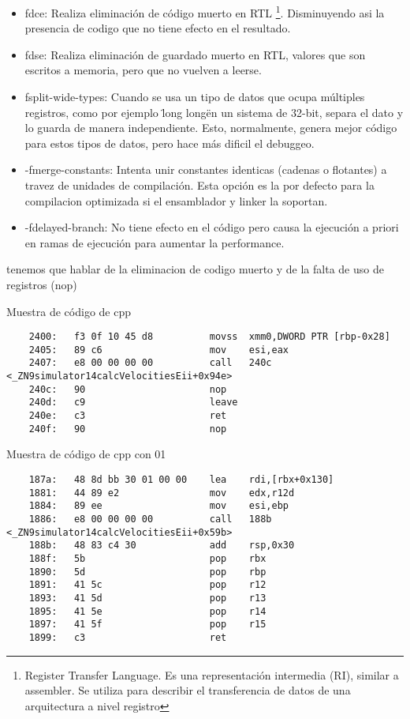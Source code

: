 \begin{itemize}
	\item fdce: Realiza eliminación de código muerto en RTL \footnote{Register Transfer Language. Es una representación intermedia (RI), similar a assembler. Se utiliza para describir el transferencia de datos de una arquitectura a nivel registro}. Disminuyendo asi la presencia de codigo que no tiene efecto en el resultado.
	\item fdse: Realiza eliminación de guardado muerto en RTL, valores que son escritos a memoria, pero que no vuelven a leerse.
	\item fsplit-wide-types: Cuando se usa un tipo de datos que ocupa múltiples registros, como por ejemplo \"long long\" en un sistema de 32-bit, separa el dato y lo guarda de manera independiente. Esto, normalmente, genera mejor código para estos tipos de datos, pero hace más dificil el debuggeo.
	\item -fmerge-constants: Intenta unir constantes identicas (cadenas o flotantes) a travez de unidades de compilación. Esta opción es la por defecto para la compilacion optimizada si el ensamblador y linker la soportan.
	\item -fdelayed-branch: No tiene efecto en el código pero causa la ejecución a priori en ramas de ejecución para aumentar la performance.
\end{itemize}


\colorbox{BurntOrange}{tenemos que hablar de la eliminacion de codigo muerto y de la falta de uso de registros (nop)}

Muestra de código de cpp 
\begin{verbatim}
    2400:	f3 0f 10 45 d8       	movss  xmm0,DWORD PTR [rbp-0x28]
    2405:	89 c6                	mov    esi,eax
    2407:	e8 00 00 00 00       	call   240c <_ZN9simulator14calcVelocitiesEii+0x94e>
    240c:	90                   	nop
    240d:	c9                   	leave  
    240e:	c3                   	ret    
    240f:	90                   	nop
\end{verbatim}

Muestra de código de cpp con 01
\begin{verbatim}
    187a:	48 8d bb 30 01 00 00 	lea    rdi,[rbx+0x130]
    1881:	44 89 e2             	mov    edx,r12d
    1884:	89 ee                	mov    esi,ebp
    1886:	e8 00 00 00 00       	call   188b <_ZN9simulator14calcVelocitiesEii+0x59b>
    188b:	48 83 c4 30          	add    rsp,0x30
    188f:	5b                   	pop    rbx
    1890:	5d                   	pop    rbp
    1891:	41 5c                	pop    r12
    1893:	41 5d                	pop    r13
    1895:	41 5e                	pop    r14
    1897:	41 5f                	pop    r15
    1899:	c3                   	ret 
\end{verbatim}


